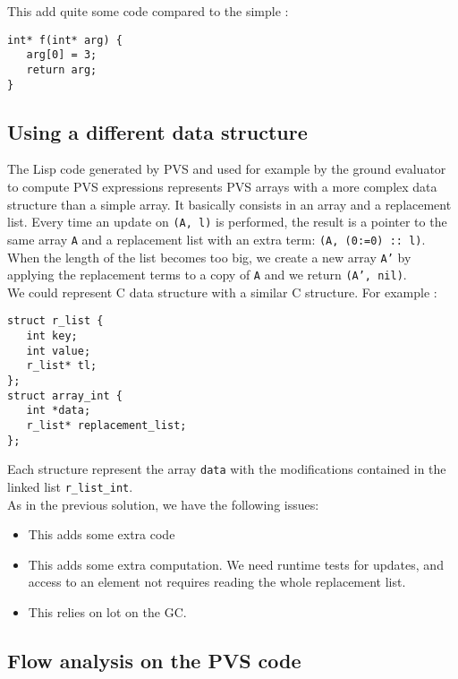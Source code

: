 \documentclass[12pt,a4paper]{article}
\newcommand{\cl}[1]{\texttt{#1}}
\begin{document}
This add quite some code compared to the simple :

\begin{lstlisting}
int* f(int* arg) {
   arg[0] = 3;
   return arg;
}
\end{lstlisting}




\subsection{Using a different data structure}

The Lisp code generated by PVS and used for example by the ground evaluator to compute PVS expressions represents PVS arrays with a more complex data structure than a simple array. It basically consists in an array and a replacement list. Every time an update on \cl{(A, l)} is performed, the result is a pointer to the same array \cl{A} and a replacement list with an extra term: \cl{(A, (0:=0) :: l)}. When the length of the list becomes too big, we create a new array \cl{A'} by applying the replacement terms to a copy of \cl{A} and we return \cl{(A', nil)}.\\

We could represent C data structure with a similar C structure. For example :
\begin{lstlisting}
struct r_list {
   int key;
   int value;
   r_list* tl;
};
struct array_int {
   int *data;
   r_list* replacement_list;
};
\end{lstlisting}

Each structure represent the array \cl{data} with the modifications contained in the linked list \cl{r\_list\_int}.\\

As in the previous solution, we have the following issues:
\begin{itemize}
\item This adds some extra code
\item This adds some extra computation. We need runtime tests for updates, and access to an element not requires reading the whole replacement list.
\item This relies on lot on the GC.
\end{itemize}


\subsection{Flow analysis on the PVS code}
\end{document}
